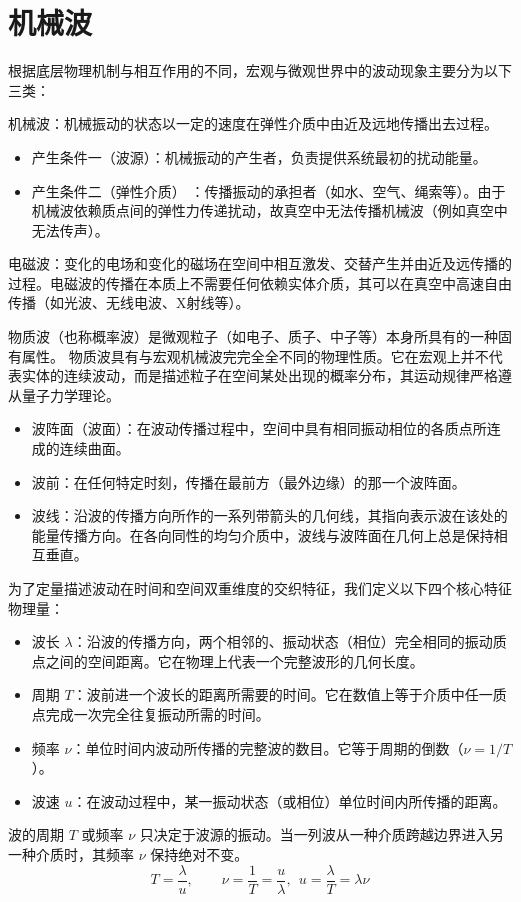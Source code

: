 \documentclass[lang=cn,11pt]{elegantbook}
\begin{document}
\chapter{机械波}

根据底层物理机制与相互作用的不同，宏观与微观世界中的波动现象主要分为以下三类：

\begin{definition}
机械波：机械振动的状态以一定的速度在弹性介质中由近及远地传播出去过程。
\begin{itemize}
    \item 产生条件一（波源）：机械振动的产生者，负责提供系统最初的扰动能量。
    \item 产生条件二（弹性介质） ：传播振动的承担者（如水、空气、绳索等）。由于机械波依赖质点间的弹性力传递扰动，故真空中无法传播机械波（例如真空中无法传声）。
\end{itemize}
电磁波：变化的电场和变化的磁场在空间中相互激发、交替产生并由近及远传播的过程。电磁波的传播在本质上不需要任何依赖实体介质，其可以在真空中高速自由传播（如光波、无线电波、X射线等）。

物质波（也称概率波）是微观粒子（如电子、质子、中子等）本身所具有的一种固有属性。 物质波具有与宏观机械波完完全全不同的物理性质。它在宏观上并不代表实体的连续波动，而是描述粒子在空间某处出现的概率分布，其运动规律严格遵从量子力学理论。
\end{definition}

\begin{definition}
\begin{itemize}
\item 波阵面（波面）：在波动传播过程中，空间中具有相同振动相位的各质点所连成的连续曲面。
\item 波前：在任何特定时刻，传播在最前方（最外边缘）的那一个波阵面。
\item 波线：沿波的传播方向所作的一系列带箭头的几何线，其指向表示波在该处的能量传播方向。在各向同性的均匀介质中，波线与波阵面在几何上总是保持相互垂直。
\end{itemize}
为了定量描述波动在时间和空间双重维度的交织特征，我们定义以下四个核心特征物理量：
\begin{itemize}
\item 波长 $\lambda$：沿波的传播方向，两个相邻的、振动状态（相位）完全相同的振动质点之间的空间距离。它在物理上代表一个完整波形的几何长度。
\item 周期 $T$：波前进一个波长的距离所需要的时间。它在数值上等于介质中任一质点完成一次完全往复振动所需的时间。
\item 频率 $\nu$：单位时间内波动所传播的完整波的数目。它等于周期的倒数（$\nu = 1/T$）。
\item 波速 $u$：在波动过程中，某一振动状态（或相位）单位时间内所传播的距离。
\end{itemize}
波的周期 $T$ 或频率 $\nu$ 只决定于波源的振动。当一列波从一种介质跨越边界进入另一种介质时，其频率 $\nu$ 保持绝对不变。
$$T = \frac{\lambda}{u}, \qquad \nu = \frac{1}{T} = \frac{u}{\lambda},~~\boxed{u = \frac{\lambda}{T} = \lambda \nu}$$
\end{definition}
\end{document}
